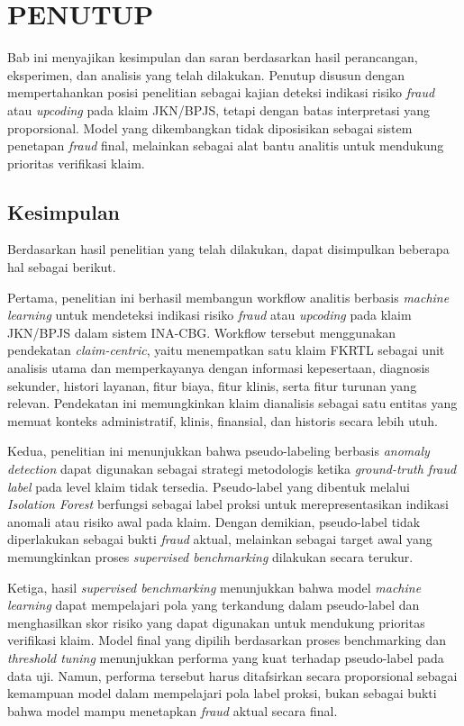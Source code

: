 \chapter{PENUTUP}

Bab ini menyajikan kesimpulan dan saran berdasarkan hasil perancangan, eksperimen, dan analisis yang telah dilakukan. Penutup disusun dengan mempertahankan posisi penelitian sebagai kajian deteksi indikasi risiko \emph{fraud} atau \emph{upcoding} pada klaim JKN/BPJS, tetapi dengan batas interpretasi yang proporsional. Model yang dikembangkan tidak diposisikan sebagai sistem penetapan \emph{fraud} final, melainkan sebagai alat bantu analitis untuk mendukung prioritas verifikasi klaim.

\section{Kesimpulan}\label{kesimpulan}

Berdasarkan hasil penelitian yang telah dilakukan, dapat disimpulkan beberapa hal sebagai berikut.

Pertama, penelitian ini berhasil membangun workflow analitis berbasis \emph{machine learning} untuk mendeteksi indikasi risiko \emph{fraud} atau \emph{upcoding} pada klaim JKN/BPJS dalam sistem INA-CBG. Workflow tersebut menggunakan pendekatan \emph{claim-centric}, yaitu menempatkan satu klaim FKRTL sebagai unit analisis utama dan memperkayanya dengan informasi kepesertaan, diagnosis sekunder, histori layanan, fitur biaya, fitur klinis, serta fitur turunan yang relevan. Pendekatan ini memungkinkan klaim dianalisis sebagai satu entitas yang memuat konteks administratif, klinis, finansial, dan historis secara lebih utuh.

Kedua, penelitian ini menunjukkan bahwa pseudo-labeling berbasis \emph{anomaly detection} dapat digunakan sebagai strategi metodologis ketika \emph{ground-truth fraud label} pada level klaim tidak tersedia. Pseudo-label yang dibentuk melalui \emph{Isolation Forest} berfungsi sebagai label proksi untuk merepresentasikan indikasi anomali atau risiko awal pada klaim. Dengan demikian, pseudo-label tidak diperlakukan sebagai bukti \emph{fraud} aktual, melainkan sebagai target awal yang memungkinkan proses \emph{supervised benchmarking} dilakukan secara terukur.

Ketiga, hasil \emph{supervised benchmarking} menunjukkan bahwa model \emph{machine learning} dapat mempelajari pola yang terkandung dalam pseudo-label dan menghasilkan skor risiko yang dapat digunakan untuk mendukung prioritas verifikasi klaim. Model final yang dipilih berdasarkan proses benchmarking dan \emph{threshold tuning} menunjukkan performa yang kuat terhadap pseudo-label pada data uji. Namun, performa tersebut harus ditafsirkan secara proporsional sebagai kemampuan model dalam mempelajari pola label proksi, bukan sebagai bukti bahwa model mampu menetapkan \emph{fraud} aktual secara final.

